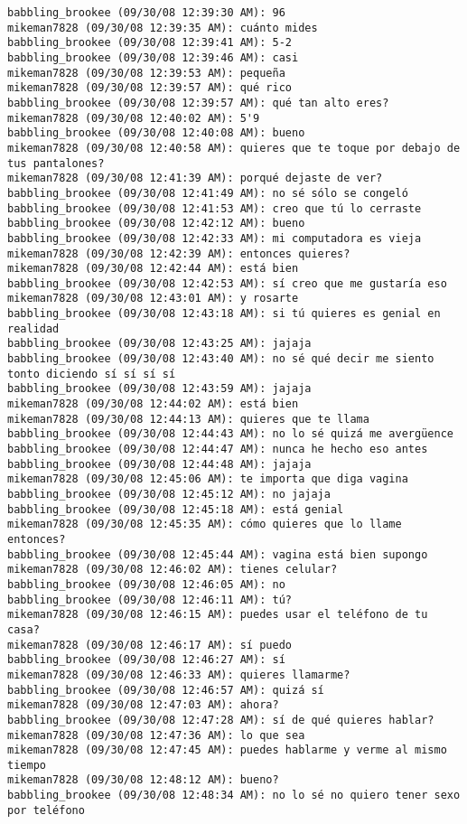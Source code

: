 \begin{verbatim}
babbling_brookee (09/30/08 12:39:30 AM): 96
mikeman7828 (09/30/08 12:39:35 AM): cuánto mides
babbling_brookee (09/30/08 12:39:41 AM): 5-2
babbling_brookee (09/30/08 12:39:46 AM): casi
mikeman7828 (09/30/08 12:39:53 AM): pequeña
mikeman7828 (09/30/08 12:39:57 AM): qué rico
babbling_brookee (09/30/08 12:39:57 AM): qué tan alto eres?
mikeman7828 (09/30/08 12:40:02 AM): 5'9
babbling_brookee (09/30/08 12:40:08 AM): bueno
mikeman7828 (09/30/08 12:40:58 AM): quieres que te toque por debajo de tus pantalones?
mikeman7828 (09/30/08 12:41:39 AM): porqué dejaste de ver?
babbling_brookee (09/30/08 12:41:49 AM): no sé sólo se congeló
babbling_brookee (09/30/08 12:41:53 AM): creo que tú lo cerraste
babbling_brookee (09/30/08 12:42:12 AM): bueno
babbling_brookee (09/30/08 12:42:33 AM): mi computadora es vieja
mikeman7828 (09/30/08 12:42:39 AM): entonces quieres?
mikeman7828 (09/30/08 12:42:44 AM): está bien
babbling_brookee (09/30/08 12:42:53 AM): sí creo que me gustaría eso
mikeman7828 (09/30/08 12:43:01 AM): y rosarte
babbling_brookee (09/30/08 12:43:18 AM): si tú quieres es genial en realidad
babbling_brookee (09/30/08 12:43:25 AM): jajaja
babbling_brookee (09/30/08 12:43:40 AM): no sé qué decir me siento tonto diciendo sí sí sí sí
babbling_brookee (09/30/08 12:43:59 AM): jajaja
mikeman7828 (09/30/08 12:44:02 AM): está bien
mikeman7828 (09/30/08 12:44:13 AM): quieres que te llama
babbling_brookee (09/30/08 12:44:43 AM): no lo sé quizá me avergüence
babbling_brookee (09/30/08 12:44:47 AM): nunca he hecho eso antes
babbling_brookee (09/30/08 12:44:48 AM): jajaja
mikeman7828 (09/30/08 12:45:06 AM): te importa que diga vagina
babbling_brookee (09/30/08 12:45:12 AM): no jajaja
babbling_brookee (09/30/08 12:45:18 AM): está genial
mikeman7828 (09/30/08 12:45:35 AM): cómo quieres que lo llame entonces?
babbling_brookee (09/30/08 12:45:44 AM): vagina está bien supongo
mikeman7828 (09/30/08 12:46:02 AM): tienes celular?
babbling_brookee (09/30/08 12:46:05 AM): no
babbling_brookee (09/30/08 12:46:11 AM): tú?
mikeman7828 (09/30/08 12:46:15 AM): puedes usar el teléfono de tu casa?
mikeman7828 (09/30/08 12:46:17 AM): sí puedo
babbling_brookee (09/30/08 12:46:27 AM): sí
mikeman7828 (09/30/08 12:46:33 AM): quieres llamarme?
babbling_brookee (09/30/08 12:46:57 AM): quizá sí
mikeman7828 (09/30/08 12:47:03 AM): ahora?
babbling_brookee (09/30/08 12:47:28 AM): sí de qué quieres hablar?
mikeman7828 (09/30/08 12:47:36 AM): lo que sea
mikeman7828 (09/30/08 12:47:45 AM): puedes hablarme y verme al mismo tiempo
mikeman7828 (09/30/08 12:48:12 AM): bueno?
babbling_brookee (09/30/08 12:48:34 AM): no lo sé no quiero tener sexo por teléfono

\end{verbatim}
